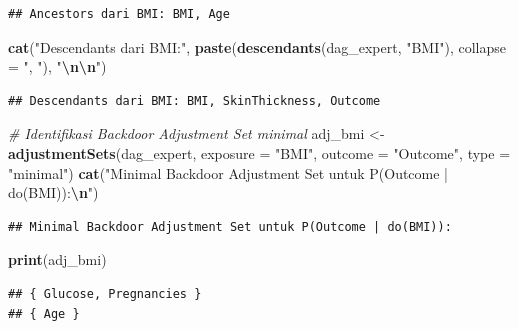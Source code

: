 \documentclass[
  11pt,
]{article}
\newenvironment{Shaded}{\begin{snugshade}}{\end{snugshade}}
\newcommand{\AttributeTok}[1]{\textcolor[rgb]{0.13,0.29,0.53}{#1}}
\newcommand{\CommentTok}[1]{\textcolor[rgb]{0.56,0.35,0.01}{\textit{#1}}}
\newcommand{\FunctionTok}[1]{\textcolor[rgb]{0.13,0.29,0.53}{\textbf{#1}}}
\newcommand{\NormalTok}[1]{#1}
\newcommand{\OtherTok}[1]{\textcolor[rgb]{0.56,0.35,0.01}{#1}}
\newcommand{\SpecialCharTok}[1]{\textcolor[rgb]{0.81,0.36,0.00}{\textbf{#1}}}
\newcommand{\StringTok}[1]{\textcolor[rgb]{0.31,0.60,0.02}{#1}}
\begin{document}
\begin{verbatim}
## Ancestors dari BMI: BMI, Age
\end{verbatim}

\begin{Shaded}
\begin{Highlighting}[]
\FunctionTok{cat}\NormalTok{(}\StringTok{"Descendants dari BMI:"}\NormalTok{, }\FunctionTok{paste}\NormalTok{(}\FunctionTok{descendants}\NormalTok{(dag\_expert, }\StringTok{"BMI"}\NormalTok{), }\AttributeTok{collapse =} \StringTok{", "}\NormalTok{), }\StringTok{"}\SpecialCharTok{\textbackslash{}n\textbackslash{}n}\StringTok{"}\NormalTok{)}
\end{Highlighting}
\end{Shaded}

\begin{verbatim}
## Descendants dari BMI: BMI, SkinThickness, Outcome
\end{verbatim}

\begin{Shaded}
\begin{Highlighting}[]
\CommentTok{\# Identifikasi Backdoor Adjustment Set minimal}
\NormalTok{adj\_bmi }\OtherTok{\textless{}{-}} \FunctionTok{adjustmentSets}\NormalTok{(dag\_expert,}
                           \AttributeTok{exposure =} \StringTok{"BMI"}\NormalTok{,}
                           \AttributeTok{outcome  =} \StringTok{"Outcome"}\NormalTok{,}
                           \AttributeTok{type     =} \StringTok{"minimal"}\NormalTok{)}
\FunctionTok{cat}\NormalTok{(}\StringTok{"Minimal Backdoor Adjustment Set untuk P(Outcome | do(BMI)):}\SpecialCharTok{\textbackslash{}n}\StringTok{"}\NormalTok{)}
\end{Highlighting}
\end{Shaded}

\begin{verbatim}
## Minimal Backdoor Adjustment Set untuk P(Outcome | do(BMI)):
\end{verbatim}

\begin{Shaded}
\begin{Highlighting}[]
\FunctionTok{print}\NormalTok{(adj\_bmi)}
\end{Highlighting}
\end{Shaded}

\begin{verbatim}
## { Glucose, Pregnancies }
## { Age }
\end{verbatim}
\end{document}
